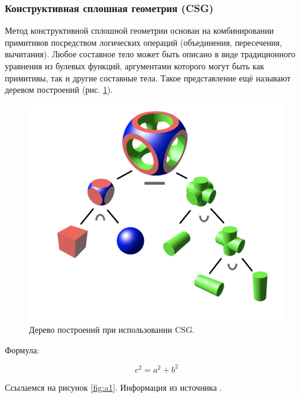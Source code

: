\subsubsection{Конструктивная сплошная геометрия (CSG)}

Метод конструктивной сплошной геометрии основан на комбинировании 
примитивов посредством логических операций (объединения, пересечения, 
вычитания).
Любое составное тело может быть описано в виде традиционного 
уравнения из булевых функций, аргументами которого могут быть как 
примитивы, так и другие составные тела. 
Такое представление ещё называют 
деревом построений (рис. \ref{fig:csg}).

\begin{figure}[h]
	\centering
	\includegraphics[width=120mm]{img/csg.png}
	\caption{Дерево построений при использовании CSG.}
	\label{fig:csg}
\end{figure}


\subsubs








Формула:

\begin{equation}
c^2 = a^2 + b^2
\end{equation}

Ссылаемся на рисунок \ref{fig:a1}. Информация из источника \cite{golang}.

